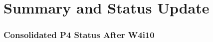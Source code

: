 \documentclass[11pt]{article}
\begin{document}
\part{Summary and Status Update}
\label{part:summary}

\section{Consolidated P4 Status After W4i10}
\label{sec:consolidated}
\end{document}
